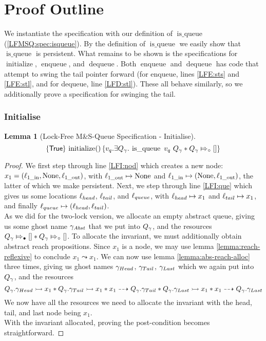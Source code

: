 \documentclass[a4paper, 11pt]{report}
\newtheorem{lemma}[theorem]{Lemma}
\newcommand{\initialise}{\operatorname{initialize}}
\newcommand{\enqueue}{\operatorname{enqueue}}
\newcommand{\dequeue}{\operatorname{dequeue}}
\newcommand{\lfmsq}{Lock-Free M\&S-Queue\xspace}
\newcommand{\isqueue}{\operatorname{is\_queue}}
\newcommand{\locin}[1]{\loc_{#1\_\text{in}}}
\newcommand{\locout}[1]{\loc_{#1\_\text{out}}}
\newcommand{\Qg}{Q_\gname}
\newcommand{\abstractstatefullfrag}[2]{#1 \Mapsto_{\circ} #2}
\newcommand{\abstractstateauth}[2]{#1 \Mapsto_{\bullet} #2}
\newcommand{\reach}[2]{#1 \leadsto #2}
\newcommand{\ar}[2]{#1 \dashrightarrow #2}
\newcommand{\ap}[2]{#1 \rightarrowtail #2}
\newcommand{\tlhocapspecinit}{\hoare{\TRUE}{\initialise \TT}{v_q . \Exists Q_\gname . \isqueue\ v_q \ Q_\gname \star \abstractstatefullfrag{\Qg}{[]}}}
\newcommand{\lfhocapspecinit}{\tlhocapspecinit}
\begin{document}
\section{Proof Outline}
\label{LFMSQ:section:proof-outline}

We instantiate the specification with our definition of $\isqueue$ (\ref{LFMSQ:spec:isqueue}). By the definition of $\isqueue$ we easily show that $\isqueue$ is persistent. What remains to be shown is the specifications for $\initialise$, $\enqueue$, and $\dequeue$. Both $\enqueue$ and $\dequeue$ has code that attempt to swing the tail pointer forward (for enqueue, lines \ref{LFE:sts} and \ref{LFE:stl}, and for dequeue, line \ref{LFD:stl}). These all behave similarly, so we additionally prove a specification for swinging the tail.

\subsubsection{Initialise}
\begin{lemma}[\lfmsq Specification - Initialise]\label{LFMSQ:spec:init}
  \begin{equation*}
    \lfhocapspecinit
  \end{equation*}
\end{lemma}
\begin{proof}
We first step through line \ref{LFI:nod} which creates a new node: $x_1 = (\locin{1}, \None, \locout{1})$, with $\locout{1} \mapsto \None$ and $\locin{1} \mapsto (\None, \locout{1})$, the latter of which we make persistent. Next, we step through line \ref{LFI:que} which gives us some locations $\ell_{head}$, $\ell_{tail}$, and $\ell_{queue}$, with $\ell_{head} \mapsto x_1$ and $\ell_{tail} \mapsto x_1$, and finally $\ell_{queue} \mapsto (\ell_{head}, \ell_{tail})$.\\
As we did for the two-lock version, we allocate an empty abstract queue, giving us some ghost name $\gamma_{Abst}$ that we put into $\Qg$, and the resources $\abstractstateauth{\Qg}{[]} \star \abstractstatefullfrag{\Qg}{[]}$. To allocate the invariant, we must additionally obtain abstract reach propositions. Since $x_1$ is a node, we may use lemma \ref{lemma:reach-reflexive} to conclude $\reach{x_1}{x_1}$. We can now use lemma \ref{lemma:abs-reach-alloc} three times, giving us ghost names $\gamma_{Head}$, $\gamma_{Tail}$, $\gamma_{Last}$ which we again put into $\Qg$, and the resources
\begin{equation*}
  \ap{\Qg.\gname_{Head}}{x_1} \star \ap{\Qg.\gname_{Tail}}{x_1} \star \ar{x_1}{\Qg.\gname_{Tail}} \star \ap{\Qg.\gname_{Last}}{x_1} \star \ar{x_1}{\Qg.\gname_{Last}}
\end{equation*}
We now have all the resources we need to allocate the invariant with the head, tail, and last node being $x_1$.\\
With the invariant allocated, proving the post-condition becomes straightforward.
\end{proof}
\end{document}
